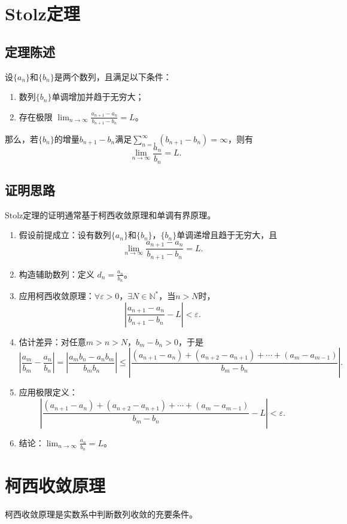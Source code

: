 
\section{Stolz定理}

\subsection{定理陈述}
设$\{a_n\}$和$\{b_n\}$是两个数列，且满足以下条件：
\begin{enumerate}
    \item 数列$\{b_n\}$单调增加并趋于无穷大；
    \item 存在极限 $\displaystyle\lim_{n\rightarrow\infty} \frac{a_{n+1}-a_n}{b_{n+1}-b_n} = L$。
\end{enumerate}
那么，若$\{b_n\}$的增量$b_{n+1}-b_n$满足$\displaystyle\sum_{n=1}^{\infty}(b_{n+1}-b_n)=\infty$，则有
\[
\lim_{n\rightarrow\infty}\frac{a_n}{b_n}=L.
\]

\subsection{证明思路}
Stolz定理的证明通常基于柯西收敛原理和单调有界原理。
\begin{enumerate}
    \item 假设前提成立：设有数列$\{a_n\}$和$\{b_n\}$，$\{b_n\}$单调递增且趋于无穷大，且
    \[
    \lim_{n\rightarrow\infty}\frac{a_{n+1}-a_n}{b_{n+1}-b_n}=L.
    \]
    \item 构造辅助数列：定义 $\displaystyle d_n=\frac{a_n}{b_n}$。
    \item 应用柯西收敛原理：$\forall \varepsilon>0$，$\exists N\in\mathbb{N}^*$，当$n>N$时，
    \[
    \left|\frac{a_{n+1}-a_n}{b_{n+1}-b_n}-L\right|<\varepsilon.
    \]
    \item 估计差异：对任意$m>n>N$，$b_m-b_n>0$，于是
    \[
    \left|\frac{a_m}{b_m}-\frac{a_n}{b_n}\right|
    =\left|\frac{a_mb_n -a_nb_m}{b_mb_n}\right|
    \le\left|\frac{(a_{n+1}-a_n)+(a_{n+2}-a_{n+1})+\cdots+(a_m-a_{m-1})}{b_m-b_n}\right|.
    \]
    \item 应用极限定义：
    \[
    \left|\frac{(a_{n+1}-a_n)+(a_{n+2}-a_{n+1})+\cdots+(a_m-a_{m-1})}{b_m-b_n}-L\right|<\varepsilon.
    \]
    \item 结论：$\displaystyle\lim_{n\rightarrow\infty}\frac{a_n}{b_n}=L$。
\end{enumerate}

\section{柯西收敛原理}
柯西收敛原理是实数系中判断数列收敛的充要条件。


